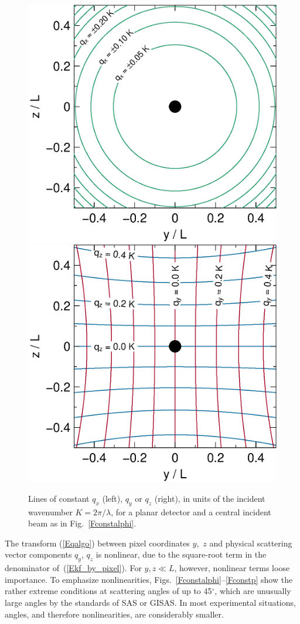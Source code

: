 \begin{figure}[t]
\begin{center}
\includegraphics[width=.47\textwidth]{fig/drawing/SAS_const_q_x.ps}
\hfill
\includegraphics[width=.47\textwidth]{fig/drawing/SAS_const_q_yz.ps}
\end{center}
\caption{Lines of constant $q_x$ (left), $q_y$ or $q_z$ (right),
in units of the incident wavenumber $K=2\pi/\lambda$,
for a planar detector and a central incident beam as in Fig.~\protect\ref{Fconstalphi}.}
\label{Fconstq}
\end{figure}

The transform (\ref{Eqalgo}) between pixel coordinates $y$,~$z$
and physical scattering vector components $q_y$, $q_z$
is nonlinear, due to the square-root term in the denominator of~(\ref{Ekf_by_pixel}).
For $y,z\ll L$, however, nonlinear terms loose importance.
To emphasize nonlinearities,
Figs.~\ref{Fconstalphi}--\ref{Fconstp}
show the rather extreme conditions at scattering angles of up to 45$^\circ$,
which are unusually large angles by the standards of SAS or GISAS.
In most experimental situations,
angles, and therefore nonlinearities, are considerably smaller.

